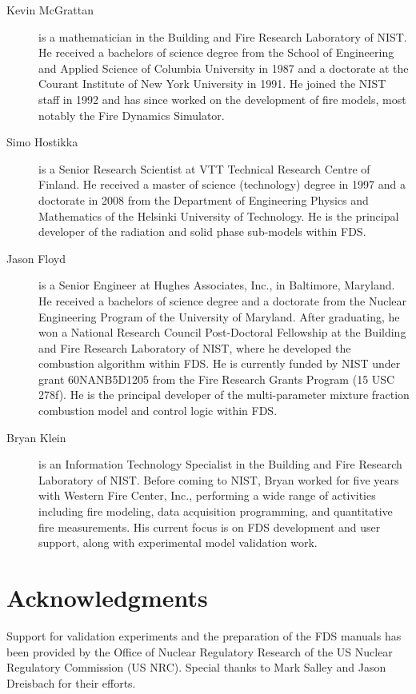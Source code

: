 \documentclass[11pt]{book}
\begin{document}
\begin{description}
\item[Kevin McGrattan] is a mathematician in the Building and Fire
Research Laboratory of NIST. He received a bachelors of science degree
from the School of Engineering and Applied Science of Columbia
University in 1987 and a doctorate at the Courant Institute of New
York University in 1991. He joined the NIST staff in 1992 and has
since worked on the development of fire models, most notably the Fire
Dynamics Simulator.
\item[Simo Hostikka] is a Senior Research Scientist at VTT Technical
Research Centre of Finland. He received a master of science
(technology) degree in 1997 and a doctorate in 2008 from
the Department of Engineering Physics and Mathematics of the
Helsinki University of Technology.  He is the principal developer of the
radiation and solid phase sub-models within FDS.
\item[Jason Floyd] is a Senior Engineer at Hughes Associates, Inc., in
Baltimore, Maryland. He received a bachelors of science degree and a
doctorate from the Nuclear Engineering Program of the University of
Maryland. After graduating, he won a National Research Council
Post-Doctoral Fellowship at the Building and Fire Research Laboratory
of NIST, where he developed the combustion algorithm within FDS. He is
currently funded by NIST under grant 60NANB5D1205 from the Fire
Research Grants Program (15 USC 278f).  He is the principal developer
of the multi-parameter mixture fraction combustion model and control
logic within FDS.
\item[Bryan Klein] is an Information Technology Specialist in the
Building and Fire Research Laboratory of NIST.  Before coming to NIST,
Bryan worked for five years with Western Fire Center, Inc., performing a
wide range of activities including fire modeling, data acquisition programming,
and quantitative fire measurements. His current focus is on FDS development and
user support, along with experimental model validation work.
\end{description}




\chapter{Acknowledgments}

\label{acksection}

Support for validation experiments and the preparation of the FDS
manuals has been provided by the Office of Nuclear Regulatory Research
of the US Nuclear Regulatory Commission (US NRC). Special thanks to
Mark Salley and Jason Dreisbach for their efforts.
\end{document}
